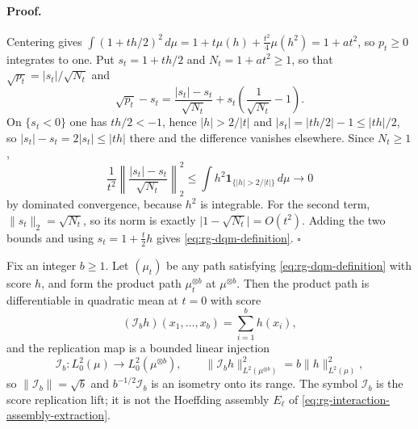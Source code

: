 \paragraph{Proof.}
Centering gives
\(\int(1+th/2)^2\,d\mu=1+t\mu(h)+\tfrac{t^2}4\mu(h^2)=1+at^2\), so \(p_t\geq0\)
integrates to one.  Put \(s_t=1+th/2\) and \(N_t=1+at^2\geq1\), so that
\(\sqrt{p_t}=\lvert s_t\rvert/\sqrt{N_t}\) and
\begin{equation}
 \sqrt{p_t}-s_t
 =\frac{\lvert s_t\rvert-s_t}{\sqrt{N_t}}
 +s_t\left(\frac1{\sqrt{N_t}}-1\right).
 \label{eq:rg-quadratic-path-split}
\end{equation}
On \(\{s_t<0\}\) one has \(th/2<-1\), hence \(\lvert h\rvert>2/\lvert t\rvert\)
and \(\lvert s_t\rvert=\lvert th/2\rvert-1\leq\lvert th\rvert/2\), so
\(\lvert s_t\rvert-s_t=2\lvert s_t\rvert\leq\lvert th\rvert\) there and the
difference vanishes elsewhere.  Since \(N_t\geq1\),
\begin{equation}
 \frac1{t^2}\left\lVert
 \frac{\lvert s_t\rvert-s_t}{\sqrt{N_t}}
 \right\rVert_2^2
 \leq\int h^2\mathbf1_{\{\lvert h\rvert>2/\lvert t\rvert\}}\,d\mu
 \longrightarrow0
 \label{eq:rg-quadratic-path-tail}
\end{equation}
by dominated convergence, because \(h^2\) is integrable.  For the second term,
\(\lVert s_t\rVert_2=\sqrt{N_t}\), so its norm is exactly
\(\lvert1-\sqrt{N_t}\rvert=O(t^2)\).  Adding the two bounds and using
\(s_t=1+\tfrac t2h\) gives \eqref{eq:rg-dqm-definition}. \(\square\)

Fix an integer \(b\geq1\).  Let \((\mu_t)\) be any path satisfying
\eqref{eq:rg-dqm-definition} with score \(h\), and form the product path
\(\mu_t^{\otimes b}\) at \(\mu^{\otimes b}\).  Then the product path is
differentiable in quadratic mean at \(t=0\) with score
\begin{equation}
 (\mathscr I_bh)(x_1,\dots,x_b)=\sum_{i=1}^bh(x_i),
 \label{eq:rg-score-replication}
\end{equation}
and the replication map is a bounded linear injection
\begin{equation}
 \mathscr I_b:L^2_0(\mu)\longrightarrow L^2_0(\mu^{\otimes b}),
 \qquad
 \lVert\mathscr I_bh\rVert_{L^2(\mu^{\otimes b})}^2
 =b\lVert h\rVert_{L^2(\mu)}^2,
 \label{eq:rg-score-replication-norm}
\end{equation}
so \(\lVert\mathscr I_b\rVert=\sqrt b\) and \(b^{-1/2}\mathscr I_b\) is an
isometry onto its range.  The symbol \(\mathscr I_b\) is the score replication
lift; it is not the Hoeffding assembly \(E_\ell\) of
\eqref{eq:rg-interaction-assembly-extraction}. 

